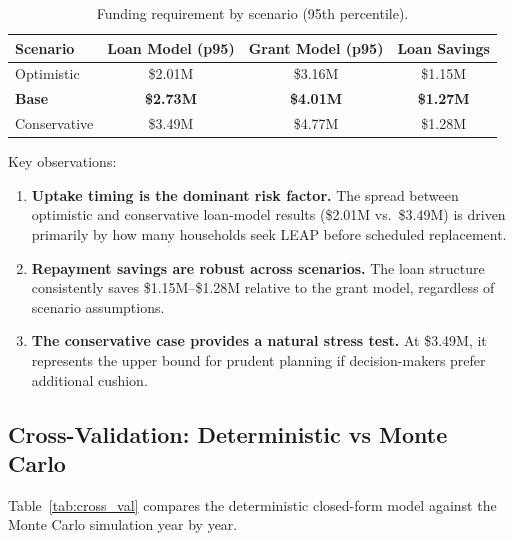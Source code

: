 \documentclass[11pt, letterpaper]{article}
\begin{document}
\begin{table}[H]
  \centering
  \caption{Funding requirement by scenario (95th percentile).}
  \label{tab:sensitivity}
  \begin{tabular}{@{}lccc@{}}
    \toprule
    \textbf{Scenario} & \textbf{Loan Model (p95)} & \textbf{Grant Model (p95)} & \textbf{Loan Savings} \\
    \midrule
    Optimistic     & \$2.01M          & \$3.16M           & \$1.15M \\
    \textbf{Base}  & \textbf{\$2.73M} & \textbf{\$4.01M}  & \textbf{\$1.27M} \\
    Conservative   & \$3.49M          & \$4.77M           & \$1.28M \\
    \bottomrule
  \end{tabular}
\end{table}

Key observations:

\begin{enumerate}[nosep]
  \item \textbf{Uptake timing is the dominant risk factor.} The spread between optimistic and conservative loan-model results (\$2.01M vs.\ \$3.49M) is driven primarily by how many households seek LEAP before scheduled replacement.
  \item \textbf{Repayment savings are robust across scenarios.} The loan structure consistently saves \$1.15M--\$1.28M relative to the grant model, regardless of scenario assumptions.
  \item \textbf{The conservative case provides a natural stress test.} At \$3.49M, it represents the upper bound for prudent planning if decision-makers prefer additional cushion.
\end{enumerate}

\subsection{Cross-Validation: Deterministic vs Monte Carlo}

Table~\ref{tab:cross_val} compares the deterministic closed-form model against the Monte Carlo simulation year by year.
\end{document}
